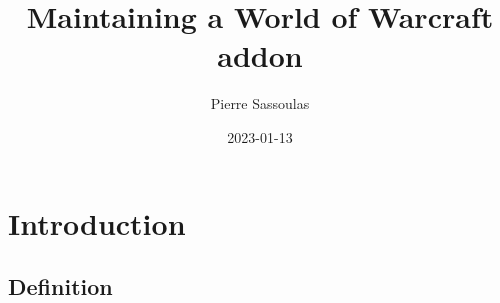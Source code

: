 \documentclass{beamer}
\begin{document}
\title{Maintaining a World of Warcraft addon}
\author{Pierre Sassoulas}
\date{2023-01-13}


\newcommand{\shrug}[1][]{%
\begin{tikzpicture}[baseline,x=0.8\ht\strutbox,y=0.8\ht\strutbox,line width=0.125ex,#1]
\def\arm{(-2.5,0.95) to (-2,0.95) (-1.9,1) to (-1.5,0) (-1.35,0) to (-0.8,0)};
\draw \arm;
\draw[xscale=-1] \arm;
\def\headpart{(0.6,0) arc[start angle=-40, end angle=40,x radius=0.6,y radius=0.8]};
\draw \headpart;
\draw[xscale=-1] \headpart;
\def\eye{(-0.075,0.15) .. controls (0.02,0) .. (0.075,-0.15)};
\draw[shift={(-0.3,0.8)}] \eye;
\draw[shift={(0,0.85)}] \eye;
\draw (-0.1,0.2) to [out=15,in=-100] (0.4,0.95);
\end{tikzpicture}}

\frame{\titlepage}


\section{Introduction}

\subsection{Definition}
\end{document}
